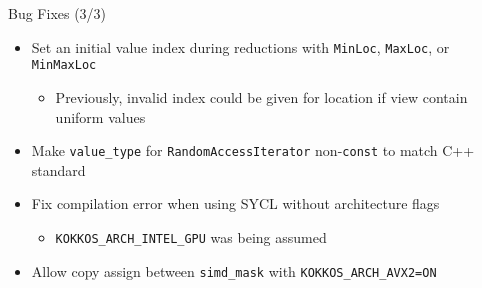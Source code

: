 \begin{frame}[fragile]{Bug Fixes (3/3)}
  \begin{itemize}
      \item Set an initial value index during reductions with \texttt{MinLoc}, \texttt{MaxLoc}, or \texttt{MinMaxLoc}
      \begin{itemize} \item[] Previously, invalid index could be given for location if view contain uniform values \end{itemize}
      \item Make \texttt{value\_type} for \texttt{RandomAccessIterator} non-\texttt{const} to match C++ standard
      \item Fix compilation error when using SYCL without architecture flags
      \begin{itemize} \item[] \texttt{KOKKOS\_ARCH\_INTEL\_GPU} was being assumed \end{itemize}
      \item Allow copy assign between \texttt{simd\_mask} with \texttt{KOKKOS\_ARCH\_AVX2=ON}
  \end{itemize}
\end{frame}

